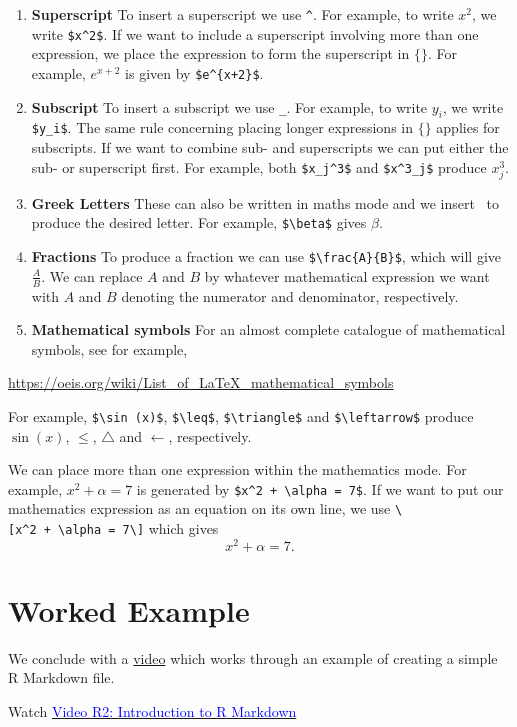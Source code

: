 \documentclass[
]{book}
\providecommand{\tightlist}{%
  \setlength{\itemsep}{0pt}\setlength{\parskip}{0pt}}
\begin{document}
\begin{enumerate}
\def\labelenumi{\arabic{enumi}.}
\tightlist
\item
  \textbf{Superscript} To insert a superscript we use \texttt{\^{}}. For example, to write \(x^2\), we write \texttt{\$x\^{}2\$}. If we want to include a superscript involving more than one expression, we place the expression to form the superscript in \(\{ \}\). For example, \(e^{x+2}\) is given by \texttt{\$e\^{}\{x+2\}\$}.\\
\item
  \textbf{Subscript} To insert a subscript we use \texttt{\_}. For example, to write \(y_i\), we write \texttt{\$y\_i\$}. The same rule concerning placing longer expressions in \(\{ \}\) applies for subscripts. If we want to combine sub- and superscripts we can put either the sub- or superscript first. For example, both \texttt{\$x\_j\^{}3\$} and \texttt{\$x\^{}3\_j\$} produce \(x_j^3\).\\
\item
  \textbf{Greek Letters} These can also be written in maths mode and we insert ~to produce the desired letter. For example, \texttt{\$\textbackslash{}beta\$} gives \(\beta\).\\
\item
  \textbf{Fractions} To produce a fraction we can use \texttt{\$\textbackslash{}frac\{A\}\{B\}\$}, which will give \(\frac{A}{B}\). We can replace \(A\) and \(B\) by whatever mathematical expression we want with \(A\) and \(B\) denoting the numerator and denominator, respectively.\\
\item
  \textbf{Mathematical symbols} For an almost complete catalogue of mathematical symbols, see for example,
\end{enumerate}

\url{https://oeis.org/wiki/List_of_LaTeX_mathematical_symbols}

For example, \texttt{\$\textbackslash{}sin\ (x)\$}, \texttt{\$\textbackslash{}leq\$}, \texttt{\$\textbackslash{}triangle\$} and \texttt{\$\textbackslash{}leftarrow\$} produce \(\sin (x)\), \(\leq\), \(\triangle\) and \(\leftarrow\), respectively.

We can place more than one expression within the mathematics mode. For example, \(x^2 + \alpha = 7\) is generated by \texttt{\$x\^{}2\ +\ \textbackslash{}alpha\ =\ 7\$}. If we want to put our mathematics expression as an equation on its own line, we use \texttt{\textbackslash{}{[}x\^{}2\ +\ \textbackslash{}alpha\ =\ 7\textbackslash{}{]}} which gives
\[x^2 + \alpha = 7.\]

\hypertarget{Rmark_work}{%
\section{Worked Example}\label{Rmark_work}}

We conclude with a \protect\hyperlink{videoR2}{video} which works through an example of creating a simple R Markdown file.

Watch \href{https://mediaspace.nottingham.ac.uk/media/Introduction+to+R+Markdown+FINAL+VERSION/1_mah0t8sg}{\textcolor{blue}{Video R2: Introduction to R Markdown}}

  
\end{document}
